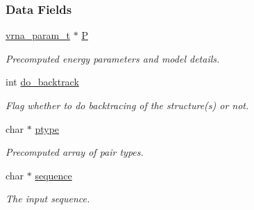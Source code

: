 \subsubsection*{Data Fields}
\begin{DoxyCompactItemize}
\item 
\mbox{\label{group__kl__neighborhood__mfe_a70da9e83ad87c37013b4bf0b265dd307}} 
\mbox{\hyperlink{group__energy__parameters_ga8a69ca7d787e4fd6079914f5343a1f35}{vrna\+\_\+param\+\_\+t}} $\ast$ \mbox{\hyperlink{group__kl__neighborhood__mfe_a70da9e83ad87c37013b4bf0b265dd307}{P}}
\begin{DoxyCompactList}\small\item\em Precomputed energy parameters and model details. \end{DoxyCompactList}\item 
\mbox{\label{group__kl__neighborhood__mfe_ade5c7e9337a458ae20bac75abdc52d64}} 
int \mbox{\hyperlink{group__kl__neighborhood__mfe_ade5c7e9337a458ae20bac75abdc52d64}{do\+\_\+backtrack}}
\begin{DoxyCompactList}\small\item\em Flag whether to do backtracing of the structure(s) or not. \end{DoxyCompactList}\item 
\mbox{\label{group__kl__neighborhood__mfe_aedf60b8b26dae05ad266d3e098d18208}} 
char $\ast$ \mbox{\hyperlink{group__kl__neighborhood__mfe_aedf60b8b26dae05ad266d3e098d18208}{ptype}}
\begin{DoxyCompactList}\small\item\em Precomputed array of pair types. \end{DoxyCompactList}\item 
\mbox{\label{group__kl__neighborhood__mfe_a3596f3d4d320318c4b8428e2abc7ab56}} 
char $\ast$ \mbox{\hyperlink{group__kl__neighborhood__mfe_a3596f3d4d320318c4b8428e2abc7ab56}{sequence}}
\begin{DoxyCompactList}\small\item\em The input sequence. \end{DoxyCompactList}\item 
\mbox{\label{group__kl__neighborhood__mfe_ab9ee459ffbfb5d2c138a033516056cdc}} 

\end{DoxyCompactItemize}

